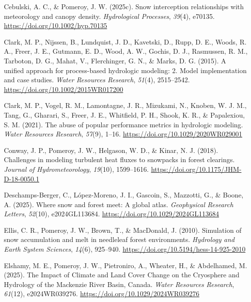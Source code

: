 \documentclass[
]{agujournal2019}
\newlength{\cslhangindent}
\newenvironment{CSLReferences}[2] %
 {\begin{list}{}{%
  \setlength{\itemindent}{0pt}
  \setlength{\leftmargin}{0pt}
  \setlength{\parsep}{0pt}
  \ifodd #1
   \setlength{\leftmargin}{\cslhangindent}
   \setlength{\itemindent}{-1\cslhangindent}
  \fi
  \setlength{\itemsep}{#2\baselineskip}}}
 {\end{list}}
\begin{document}
\begin{CSLReferences}{1}{0}
Cebulski, A. C., \& Pomeroy, J. W. (2025c). Snow interception
relationships with meteorology and canopy density. \emph{Hydrological
Processes}, \emph{39}(4), e70135.
\url{https://doi.org/10.1002/hyp.70135}

Clark, M. P., Nijssen, B., Lundquist, J. D., Kavetski, D., Rupp, D. E.,
Woods, R. A., Freer, J. E., Gutmann, E. D., Wood, A. W., Gochis, D. J.,
Rasmussen, R. M., Tarboton, D. G., Mahat, V., Flerchinger, G. N., \&
Marks, D. G. (2015). A unified approach for process-based hydrologic
modeling: 2. {Model} implementation and case studies. \emph{Water
Resources Research}, \emph{51}(4), 2515--2542.
\url{https://doi.org/10.1002/2015WR017200}

Clark, M. P., Vogel, R. M., Lamontagne, J. R., Mizukami, N., Knoben, W.
J. M., Tang, G., Gharari, S., Freer, J. E., Whitfield, P. H., Shook, K.
R., \& Papalexiou, S. M. (2021). The abuse of popular performance
metrics in hydrologic modeling. \emph{Water Resources Research},
\emph{57}(9), 1--16. \url{https://doi.org/10.1029/2020WR029001}

Conway, J. P., Pomeroy, J. W., Helgason, W. D., \& Kinar, N. J. (2018).
Challenges in modeling turbulent heat fluxes to snowpacks in forest
clearings. \emph{Journal of Hydrometeorology}, \emph{19}(10),
1599--1616. \url{https://doi.org/10.1175/JHM-D-18-0050.1}

Deschamps-Berger, C., López-Moreno, J. I., Gascoin, S., Mazzotti, G., \&
Boone, A. (2025). Where snow and forest meet: A global atlas.
\emph{Geophysical Research Letters}, \emph{52}(10), e2024GL113684.
\url{https://doi.org/10.1029/2024GL113684}

Ellis, C. R., Pomeroy, J. W., Brown, T., \& MacDonald, J. (2010).
Simulation of snow accumulation and melt in needleleaf forest
environments. \emph{Hydrology and Earth System Sciences}, \emph{14}(6),
925--940. \url{https://doi.org/10.5194/hess-14-925-2010}

Elshamy, M. E., Pomeroy, J. W., Pietroniro, A., Wheater, H., \&
Abdelhamed, M. (2025). The {Impact} of {Climate} and {Land Cover Change}
on the {Cryosphere} and {Hydrology} of the {Mackenzie River Basin},
{Canada}. \emph{Water Resources Research}, \emph{61}(12), e2024WR039276.
\url{https://doi.org/10.1029/2024WR039276}


\end{CSLReferences}
\end{document}
